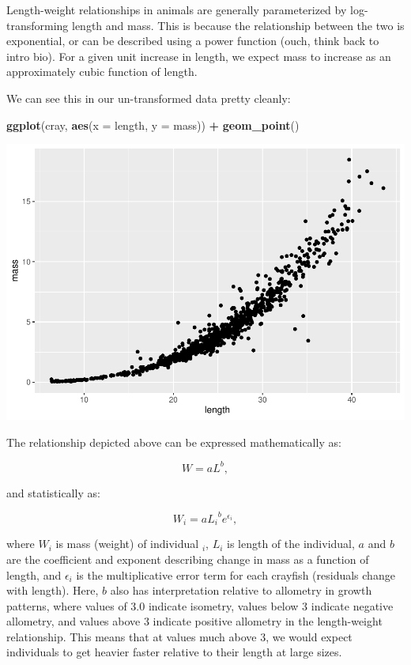 \documentclass[
]{book}
\newenvironment{Shaded}{\begin{snugshade}}{\end{snugshade}}
\newcommand{\DataTypeTok}[1]{\textcolor[rgb]{0.13,0.29,0.53}{#1}}
\newcommand{\KeywordTok}[1]{\textcolor[rgb]{0.13,0.29,0.53}{\textbf{#1}}}
\newcommand{\NormalTok}[1]{#1}
\newcommand{\OperatorTok}[1]{\textcolor[rgb]{0.81,0.36,0.00}{\textbf{#1}}}
\newcommand{\StringTok}[1]{\textcolor[rgb]{0.31,0.60,0.02}{#1}}
\begin{document}
Length-weight relationships in animals are generally parameterized by log-transforming length and mass. This is because the relationship between the two is exponential, or can be described using a power function (ouch, think back to intro bio). For a given unit increase in length, we expect mass to increase as an approximately cubic function of length.

We can see this in our un-transformed data pretty cleanly:

\begin{Shaded}
\begin{Highlighting}[]
\KeywordTok{ggplot}\NormalTok{(cray, }\KeywordTok{aes}\NormalTok{(}\DataTypeTok{x =}\NormalTok{ length, }\DataTypeTok{y =}\NormalTok{ mass)) }\OperatorTok{+}
\StringTok{  }\KeywordTok{geom_point}\NormalTok{()}
\end{Highlighting}
\end{Shaded}

\includegraphics{worstr_files/figure-latex/unnamed-chunk-371-1.pdf}

The relationship depicted above can be expressed mathematically as:

\[W = aL^b,\]

and statistically as:

\[W_i = a {L_i}^b e^{\epsilon_i},\]

where \(W_i\) is mass (weight) of individual \(_i\), \(L_i\) is length of the individual, \(a\) and \(b\) are the coefficient and exponent describing change in mass as a function of length, and \(\epsilon_i\) is the multiplicative error term for each crayfish (residuals change with length). Here, \(b\) also has interpretation relative to allometry in growth patterns, where values of 3.0 indicate isometry, values below 3 indicate negative allometry, and values above 3 indicate positive allometry in the length-weight relationship. This means that at values much above 3, we would expect individuals to get heavier faster relative to their length at large sizes.
\end{document}
